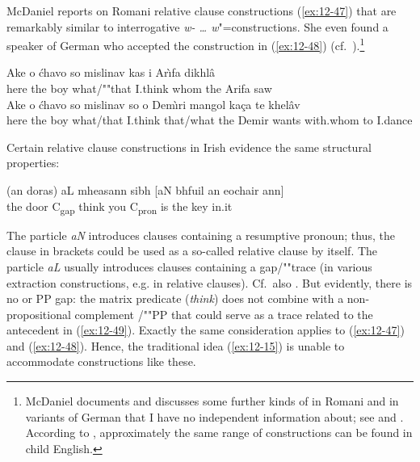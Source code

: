 \documentclass[output=paper]{langsci/langscibook}
\begin{document}
McDaniel reports on Romani relative clause constructions (\ref{ex:12-47}) that are
remarkably similar to interrogative \textit{w- \ldots{}  w}"=constructions. She even found a
speaker of German who accepted the construction in (\ref{ex:12-48}) (cf.\ \citealt[189, note 8]{McDaniel1986}).\footnote{%
	McDaniel documents and discusses some further kinds of  in Romani and in variants of German that I have no independent information
about; see \citet{McDaniel1986} and \citet{McDaniel1989}. According to \citet{McDaniel1995}, approximately the same range of constructions can be found
in child English.%
}
\begin{exe}
\judgewidth{\%}
\ex
\label{ex:12-47}
\begin{xlist}
\ex
\label{ex:12-47a}
\gll
Ake o \'chavo so mislinav kas i Ar\`{\i}fa dikhl\^a \\
                 here the boy what/""that I.think whom the Arifa saw \\
\ex
\label{ex:12-47b}
\gll
Ake o \'chavo so mislinav so o Dem\`{\i}ri mangol ka\c{c}a te khel\^av \\
                 here the boy what/that I.think that/what the Demir wants with.whom to I.dance \\
\end{xlist}
\end{exe}
Certain relative clause constructions in Irish evidence the same
structural properties:
\begin{exe}
\ex
\label{ex:12-49}
\gll
(an doras) aL   mheasann sibh [aN bhfuil an eochair ann]\\
the door C\textsubscript{gap} think you {\hphantom{[}C\textsubscript{pron}} is the key in.it \\
\end{exe}
The particle \textit{aN} introduces clauses containing a resumptive
pronoun; thus, the clause in brackets could be used as a so-called
 relative clause by itself. The particle \textit{aL} usually
introduces clauses containing a gap/""trace (in various extraction
constructions, e.g. in  relative clauses). Cf.\ also \citet[44; 168]{McCloskey1979}. But evidently, there is no  or PP gap: the matrix
predicate (\textit{think}) does not combine with a non-propositional
complement /""PP that could serve as a trace related to the antecedent
 in (\ref{ex:12-49}).  Exactly the same consideration applies to (\ref{ex:12-47}) and
(\ref{ex:12-48}). Hence, the traditional idea (\ref{ex:12-15}) is unable to accommodate
constructions like these.

\sloppy
\printbibliography[heading=subbibliography,notkeyword=this]
\label{chap-w-w-end}
\end{document}

